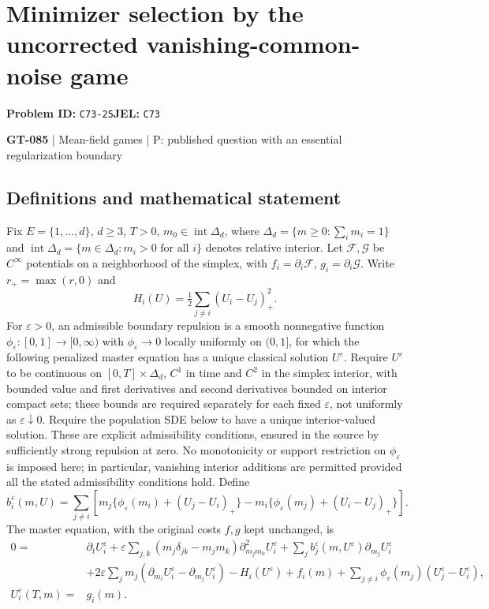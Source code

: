 \documentclass[11pt,a4paper]{article}
\begin{document}
\section*{Minimizer selection by the uncorrected vanishing-common-noise game}
\textbf{Problem ID:} \texttt{C73-25}\quad \textbf{JEL:} \texttt{C73}\par
\label{problem:OP-0215}
\label{game:GT-085}
{\sffamily\small\color{muted}
{\small\textbf{GT-085} | Mean-field games | P: published question with an essential regularization boundary\par}
\par}
\subsection*{Definitions and mathematical statement}
Fix $E=\{1,\ldots,d\}$, $d\geq3$, $T>0$, $m_0\in\operatorname{int}\Delta_d$, where $\Delta_d=\{m\geq0:\sum_i m_i=1\}$ and $\operatorname{int}\Delta_d=\{m\in\Delta_d:m_i>0\text{ for all }i\}$ denotes relative interior. Let $\mathcal F,\mathcal G$ be $C^\infty$ potentials on a neighborhood of the simplex, with $f_i=\partial_i\mathcal F$, $g_i=\partial_i\mathcal G$. Write $r_+=\max(r,0)$ and
\[
 H_i(U)=\tfrac12\sum_{j\ne i}(U_i-U_j)_+^2.
\]
For $\varepsilon>0$, an admissible boundary repulsion is a smooth nonnegative function $\phi_\varepsilon:[0,1]\to[0,\infty)$ with $\phi_\varepsilon\to0$ locally uniformly on $(0,1]$, for which the following penalized master equation has a unique classical solution $U^\varepsilon$. Require $U^\varepsilon$ to be continuous on $[0,T]\times\Delta_d$, $C^1$ in time and $C^2$ in the simplex interior, with bounded value and first derivatives and second derivatives bounded on interior compact sets; these bounds are required separately for each fixed $\varepsilon$, not uniformly as $\varepsilon\downarrow0$. Require the population SDE below to have a unique interior-valued solution. These are explicit admissibility conditions, ensured in the source by sufficiently strong repulsion at zero. No monotonicity or support restriction on $\phi_\varepsilon$ is imposed here; in particular, vanishing interior additions are permitted provided all the stated admissibility conditions hold. Define
\[
 b_i^\varepsilon(m,U)=\sum_{j\ne i}
 \left[m_j\{\phi_\varepsilon(m_i)+(U_j-U_i)_+\}
       -m_i\{\phi_\varepsilon(m_j)+(U_i-U_j)_+\}\right].
\]
The master equation, with the original costs $f,g$ kept unchanged, is
\[
 \begin{split}
 0={}&\partial_tU_i^\varepsilon
 +\varepsilon\sum_{j,k}(m_j\delta_{jk}-m_jm_k)\partial_{m_jm_k}^2U_i^\varepsilon
 +\sum_j b_j^\varepsilon(m,U^\varepsilon)\partial_{m_j}U_i^\varepsilon\\
 &+2\varepsilon\sum_jm_j(\partial_{m_i}U_i^\varepsilon-\partial_{m_j}U_i^\varepsilon)
 -H_i(U^\varepsilon)+f_i(m)
 +\sum_{j\ne i}\phi_\varepsilon(m_j)(U_j^\varepsilon-U_i^\varepsilon),\\
 U_i^\varepsilon(T,m)={}&g_i(m).
 \end{split}
\]
\end{document}
